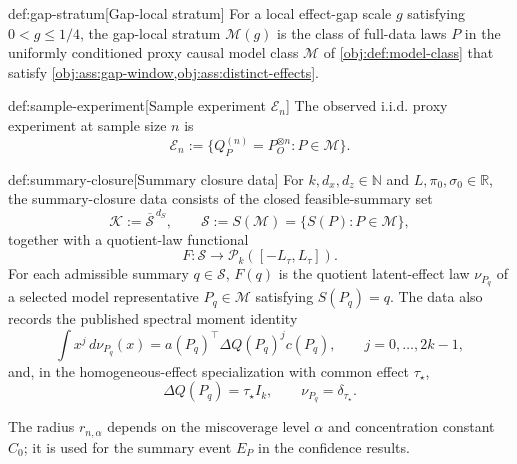 \begin{definitionv}{def:gap-stratum}[Gap-local stratum]
For a local effect-gap scale \(g\) satisfying \(0<g\le 1/4\), the gap-local stratum \(\mathcal M(g)\) is the class of full-data laws \(P\) in the uniformly conditioned proxy causal model class \(\mathcal M\) of \cref{obj:def:model-class} that satisfy \cref{obj:ass:gap-window,obj:ass:distinct-effects}.
\end{definitionv}

\begin{definitionv}{def:sample-experiment}[Sample experiment \(\mathcal E_n\)]
The observed i.i.d. proxy experiment at sample size \(n\) is
\[
\mathcal E_n:=\{Q_P^{(n)}=P_O^{\otimes n}:P\in\mathcal M\}.
\]
\end{definitionv}

\begin{definitionv}{def:summary-closure}[Summary closure data]
For \(k,d_x,d_z\in\mathbb N\) and \(L,\pi_0,\sigma_0\in\mathbb R\), the summary-closure data consists of the closed feasible-summary set
\[
\mathcal K:=\overline{\mathscr S}^{\,d_S},
\qquad
\mathscr S:=S(\mathcal M)=\{S(P):P\in\mathcal M\},
\]
together with a quotient-law functional
\[
F:\mathscr S\to\mathcal P_k([-L_\tau,L_\tau]).
\]
For each admissible summary \(q\in\mathscr S\), \(F(q)\) is the quotient latent-effect law \(\nu_{P_q}\) of a selected model representative \(P_q\in\mathcal M\) satisfying \(S(P_q)=q\). The data also records the published spectral moment identity
\[
\int x^j\,d\nu_{P_q}(x)
=
a(P_q)^\top\Delta Q(P_q)^j c(P_q),
\qquad j=0,\ldots,2k-1,
\]
and, in the homogeneous-effect specialization with common effect \(\tau_\star\),
\[
\Delta Q(P_q)=\tau_\star I_k,
\qquad
\nu_{P_q}=\delta_{\tau_\star}.
\]
\end{definitionv}

The radius \(r_{n,\alpha}\) depends on the miscoverage level \(\alpha\) and concentration constant \(C_0\); it is used for the summary event \(E_P\) in the confidence results.

